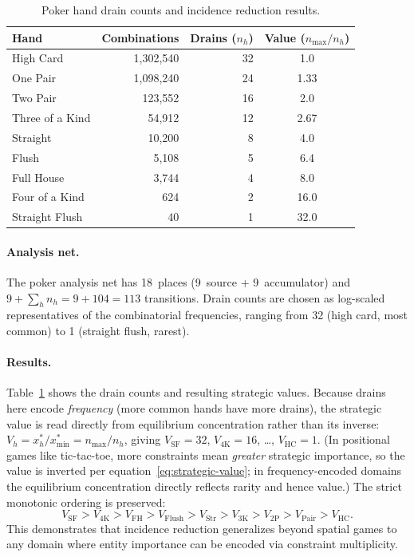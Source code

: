 \documentclass[11pt,a4paper]{article}
\begin{document}
\begin{table}[ht]
\centering
\caption{Poker hand drain counts and incidence reduction results.}
\label{tab:poker}
\begin{tabular}{@{}lrrc@{}}
\toprule
Hand & Combinations & Drains ($n_h$) & Value ($n_{\max}/n_h$) \\
\midrule
High Card       & 1{,}302{,}540 & 32 & 1.0 \\
One Pair        & 1{,}098{,}240 & 24 & 1.33 \\
Two Pair        &    123{,}552  & 16 & 2.0 \\
Three of a Kind &     54{,}912  & 12 & 2.67 \\
Straight        &     10{,}200  &  8 & 4.0 \\
Flush           &      5{,}108  &  5 & 6.4 \\
Full House      &      3{,}744  &  4 & 8.0 \\
Four of a Kind  &        624    &  2 & 16.0 \\
Straight Flush  &         40    &  1 & 32.0 \\
\bottomrule
\end{tabular}
\end{table}

\paragraph{Analysis net.}
The poker analysis net has 18~places (9~source + 9~accumulator) and $9 + \sum_h n_h = 9 + 104 = 113$ transitions.
Drain counts are chosen as log-scaled representatives of the combinatorial frequencies, ranging from 32 (high card, most common) to 1 (straight flush, rarest).

\paragraph{Results.}
Table~\ref{tab:poker} shows the drain counts and resulting strategic values.
Because drains here encode \emph{frequency} (more common hands have more drains), the strategic value is read directly from equilibrium concentration rather than its inverse: $V_h = x_h^* / x_{\min}^* = n_{\max}/n_h$, giving $V_{\mathrm{SF}} = 32$, $V_{\mathrm{4K}} = 16$, \ldots, $V_{\mathrm{HC}} = 1$.
(In positional games like tic-tac-toe, more constraints mean \emph{greater} strategic importance, so the value is inverted per equation~\eqref{eq:strategic-value}; in frequency-encoded domains the equilibrium concentration directly reflects rarity and hence value.)
The strict monotonic ordering is preserved:
\[
  V_{\mathrm{SF}} > V_{\mathrm{4K}} > V_{\mathrm{FH}} > V_{\mathrm{Flush}} > V_{\mathrm{Str}} > V_{\mathrm{3K}} > V_{\mathrm{2P}} > V_{\mathrm{Pair}} > V_{\mathrm{HC}}.
\]
This demonstrates that incidence reduction generalizes beyond spatial games to any domain where entity importance can be encoded via constraint multiplicity.
\end{document}
